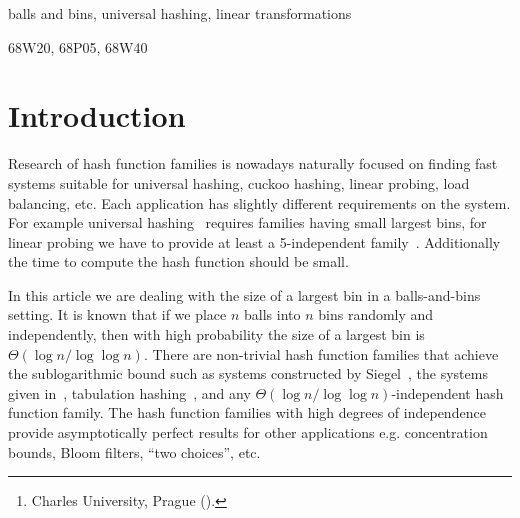 \documentclass[unicode,review]{siamart1116}
\title{\TheTitle}
\author{
  Martin Babka\thanks{Charles University, Prague (\email{babkys@gmail.com}).}
}
\newcommand{\vecspace}[2]{\mathbb{Z}_{#1}^{#2}}
\newcommand{\binvecspace}[1]{\vecspace{2}{#1}}
\numberwithin{theorem}{section}
\begin{document}
\maketitle

\begin{abstract}
We study the placement of $n$ balls into $n$ bins where balls and bins are represented as two vector spaces over $\binvecspace{}$. The placement is done according to a linear transformation between the two vector spaces.
We analyze the expected size of a largest bin. The only currently known upper bound is $O(\log n \log \log n)$ by Alon et al. and holds for placing $n \log n$ balls into $n$ bins.
We show that this bound can be improved to $O(\log n)$ in the case when $n$ balls are placed into $n$ bins.
We use the same basic technique as Alon et al. but give a tighter analysis for this case.
\end{abstract}

\begin{keywords}
balls and bins, universal hashing, linear transformations
\end{keywords}

\begin{AMS}
  68W20, %
  68P05, %
  68W40  %
\end{AMS}

\section{Introduction}

Research of hash function families is nowadays naturally focused on finding fast systems suitable for universal hashing, cuckoo hashing, linear probing, load balancing, etc.
Each application has slightly different requirements on the system.
For example universal hashing~\cite{cw} requires families having small largest bins, for linear probing we have to provide at least a 5-independent family~\cite{linear-probing}.
Additionally the time to compute the hash function should be small.

In this article we are dealing with the size of a largest bin in a balls-and-bins setting.
It is known that if we place $n$ balls into $n$ bins randomly and independently, then with high probability the size of a largest bin is $\Theta(\log n/\log \log n)$.
There are non-trivial hash function families that achieve the sublogarithmic bound such as systems constructed by Siegel~\cite{siegel}, the systems given in~\cite{celisetal}, tabulation hashing~\cite{charhash}, and any $\Theta(\log n/\log \log n)$-independent hash function family. 
The hash function families with high degrees of independence provide asymptotically perfect results for other applications e.g. concentration bounds, Bloom filters, ``two choices'', etc.
\end{document}
